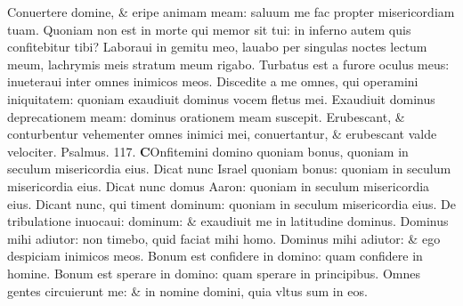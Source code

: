 \documentclass[a5paper,10pt]{book}
\begin{document}
\begin{multicols*}{2}
\newline \color{red} C\color{black}onuertere domine, \& eripe animam meam: saluum me fac propter misericordiam tuam.
\newline \color{red} Q\color{black}uoniam non est in morte qui memor sit tui: in inferno autem quis confitebitur tibi?
\newline \color{red} L\color{black}aboraui in gemitu meo, lauabo per singulas noctes lectum meum, lachrymis meis stratum meum rigabo.
\newline \color{red} T\color{black}urbatus est a furore oculus meus: inueteraui inter omnes inimicos meos.
\newline \color{red} D\color{black}iscedite a me omnes, qui operamini iniquitatem: quoniam exaudiuit dominus vocem fletus mei.
\newline \color{red} E\color{black}xaudiuit dominus deprecationem meam: dominus orationem meam suscepit.
\newline \color{red} E\color{black}rubescant, \& conturbentur vehementer omnes inimici mei, conuertantur, \& erubescant valde velociter.
\newline \color{red} Psalmus. \hypertarget{ps117}{117.} \color{black}
\lettrine[lines=2]{\bfseries \color{red} C}{}Onfitemini domino quoniam bonus, quoniam in seculum misericordia eius.
\newline \color{red} D\color{black}icat nunc Israel quoniam bonus: quoniam in seculum misericordia eius.
\newline \color{red} D\color{black}icat nunc domus Aaron: quoniam in seculum misericordia eius.
\newline \color{red} D\color{black}icant nunc, qui timent dominum: quoniam in seculum misericordia eius.
\newline \color{red} D\color{black}e tribulatione inuocaui: dominum: \& exaudiuit me in latitudine dominus.
\newline \color{red} D\color{black}ominus mihi adiutor: non timebo, quid faciat mihi homo.
\newline \color{red} D\color{black}ominus mihi adiutor: \& ego despiciam inimicos meos.
\newline \color{red} B\color{black}onum est confidere in domino: quam confidere in homine.
\newline \color{red} B\color{black}onum est sperare in domino: quam sperare in principibus.
\newline \color{red} O\color{black}mnes gentes circuierunt me: \& in nomine domini, quia vltus sum in eos.

\end{multicols*}
\end{document}
